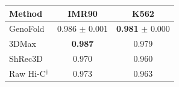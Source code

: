 \renewcommand{\arraystretch}{1.2}
\begin{tabular}{@{}lcc@{}}
\toprule
\textbf{Method} & \textbf{IMR90} & \textbf{K562} \\
\midrule
GenoFold & 0.986 $\pm$ 0.001 & \textbf{0.981} $\pm$ 0.000 \\
3DMax & \textbf{0.987} & 0.979 \\
ShRec3D & 0.970 & 0.960 \\
Raw Hi-C$^{\dagger}$ & 0.973 & 0.963 \\
\bottomrule
\end{tabular}

